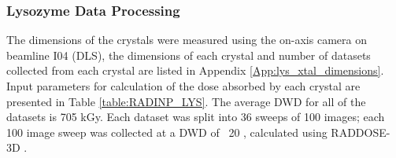 \subsubsection*{Lysozyme Data Processing}\label{sec:lysozyme_processing}	

The dimensions of the crystals were measured using the on-axis camera on beamline I04 (DLS), the dimensions of each crystal and number of datasets collected from each crystal are listed in Appendix \ref{App:lys_xtal_dimensions}. Input parameters for calculation of the dose absorbed by each crystal are presented in Table \ref{table:RADINP_LYS}. The average DWD for all of the datasets is 705 kGy. Each dataset was split into 36 sweeps of 100 images; each 100 image sweep was collected at a DWD of ~20 \kgy, calculated using RADDOSE-3D \cite{Zeldin2013}.

